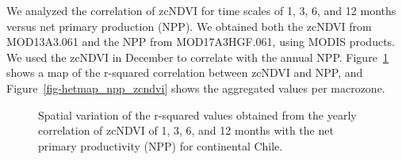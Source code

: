\documentclass[
  authoryear,
  preprint,
  3p,
  onecolumn]{elsarticle}
\begin{document}
We analyzed the correlation of zcNDVI for time scales of 1, 3, 6, and 12
months versus net primary production (NPP). We obtained both the zcNDVI
from MOD13A3.061 and the NPP from MOD17A3HGF.061, using MODIS products.
We used the zcNDVI in December to correlate with the annual NPP.
Figure~\ref{fig-r2_npp_zcNDVI} shows a map of the r-squared correlation
between zcNDVI and NPP, and Figure~\ref{fig-hetmap_npp_zcndvi} shows the
aggregated values per macrozone.

\begin{figure}[!ht]


\caption{\label{fig-r2_npp_zcNDVI}Spatial variation of the r-squared
values obtained from the yearly correlation of zcNDVI of 1, 3, 6, and 12
months with the net primary productivity (NPP) for continental Chile.}

\end{figure}%
\end{document}
